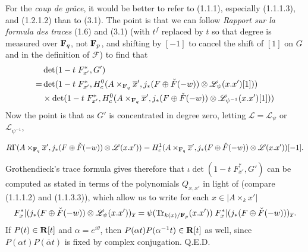 \documentclass[deligne.tex]{subfiles}
\begin{document}
For the \emph{coup de grâce}, it would be better to refer to (1.1.1),
especially (1.1.1.3), and (1.2.1.2) than to (3.1). The point is that we
can follow \emph{Rapport sur la formula des traces} (1.6) and (3.1) (with
$t^f$ replaced by $t$ so that degree is measured over $\mathbf{F}_q$, not $\mathbf{F}_p$,
and shifting by $[-1]$ to cancel the shift of $[1]$ on $G$ and
in the definition of $\mathscr F$)
to find that
\begin{align*}
	&\det(1-t\; F_{x'}^*,G') \\
	=&\det(1-t\; F_{x'}^*,H_c^0(A\times_{\mathbf{F}_q}\overline x',j_*(F\oplus\check F(-w))\otimes\mathscr L_\psi(x.x')[1])) \\
	&\times\det(1-t\; F_{x'}^*,H_c^0(A\times_{\mathbf{F}_q}\overline x',j_*(F\oplus\check F(-w))\otimes\mathscr L_{\psi^{-1}}(x.x')[1]))
\end{align*}
Now the point is that as $G'$ is concentrated in degree zero,
letting $\mathscr L=\mathscr L_\psi$ or $\mathscr L_{\psi^{-1}}$,
\begin{ceqn}\begin{equation*}
	R\Gamma(A\times_{\mathbf{F}_q}\overline x',j_*(F\oplus\check F(-w))\otimes\mathscr L(x.x'))
	=H^1_c(A\times_{\mathbf{F}_q}\overline x',j_*(F\oplus\check F(-w))\otimes\mathscr L(x.x'))[-1].
\end{equation*}\end{ceqn}
Grothendieck's trace formula gives therefore that
$\iota\det(1-t\; F_{x'}^*,G')$ can be computed as stated in terms of the
polynomials $Q_{x,x'}$ in light of \cite[1.7.6 \& 1.7.7]{Trig}
(compare (1.1.1.2) and (1.1.3.3)), which allow us
to write for each $x\in|A\times_k x'|$
\begin{equation*}
	F_x^*|(j_*(F\oplus\check F(-w))\otimes\mathscr L_\psi(x.x'))_{\overline x}
	=\psi(\operatorname{Tr}_{k(x)/\mathbf{F}_p}(x.x'))\;F_x^*|(j_*(F\oplus\check F(-w)))_{\overline x}.
\end{equation*}
If $P(t)\in\mathbf{R}[t]$ and $\alpha=e^{i\theta}$, then
$P(\alpha t)P(\alpha^{-1}t)\in\mathbf{R}[t]$ as well, since
$P(\alpha t)P(\overline\alpha t)$ is fixed by complex conjugation.
\hfill Q.E.D.
\end{document}
